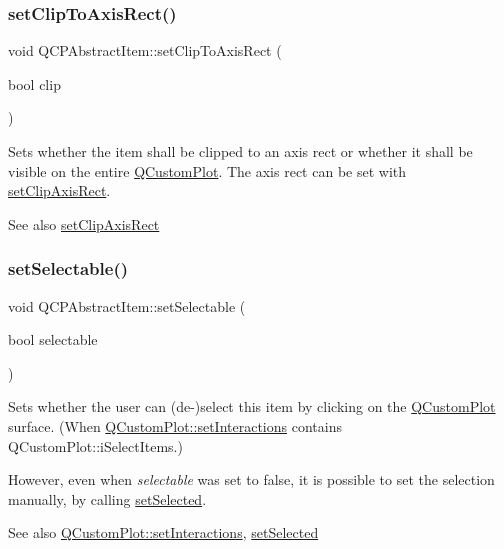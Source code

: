 \subsubsection{\texorpdfstring{set\+Clip\+To\+Axis\+Rect()}{setClipToAxisRect()}}
{\footnotesize\ttfamily void Q\+C\+P\+Abstract\+Item\+::set\+Clip\+To\+Axis\+Rect (\begin{DoxyParamCaption}\item[{bool}]{clip }\end{DoxyParamCaption})}

Sets whether the item shall be clipped to an axis rect or whether it shall be visible on the entire \hyperlink{classQCustomPlot}{Q\+Custom\+Plot}. The axis rect can be set with \hyperlink{classQCPAbstractItem_a7dc75fcbcd10206fe0b75d757ea7a347}{set\+Clip\+Axis\+Rect}.

\begin{DoxySeeAlso}{See also}
\hyperlink{classQCPAbstractItem_a7dc75fcbcd10206fe0b75d757ea7a347}{set\+Clip\+Axis\+Rect} 
\end{DoxySeeAlso}
\mbox{\label{classQCPAbstractItem_a8a8e32a55bc478b849756a78c2d87fd2}} 
\subsubsection{\texorpdfstring{set\+Selectable()}{setSelectable()}}
{\footnotesize\ttfamily void Q\+C\+P\+Abstract\+Item\+::set\+Selectable (\begin{DoxyParamCaption}\item[{bool}]{selectable }\end{DoxyParamCaption})}

Sets whether the user can (de-\/)select this item by clicking on the \hyperlink{classQCustomPlot}{Q\+Custom\+Plot} surface. (When \hyperlink{classQCustomPlot_a5ee1e2f6ae27419deca53e75907c27e5}{Q\+Custom\+Plot\+::set\+Interactions} contains Q\+Custom\+Plot\+::i\+Select\+Items.)

However, even when {\itshape selectable} was set to false, it is possible to set the selection manually, by calling \hyperlink{classQCPAbstractItem_a203de94ad586cc44d16c9565f49d3378}{set\+Selected}.

\begin{DoxySeeAlso}{See also}
\hyperlink{classQCustomPlot_a5ee1e2f6ae27419deca53e75907c27e5}{Q\+Custom\+Plot\+::set\+Interactions}, \hyperlink{classQCPAbstractItem_a203de94ad586cc44d16c9565f49d3378}{set\+Selected} 
\end{DoxySeeAlso}
\mbox{\label{classQCPAbstractItem_a203de94ad586cc44d16c9565f49d3378}} 
